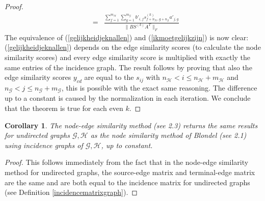 \documentclass[a4paper,11pt]{report}
\newtheorem{corollary}[theorem]{Corollary}
\newcommand{\graf}{\mathscr{G}}
\newcommand{\grafeen}{\mathscr{H}}
\newcommand{\hgraf}{\mathcal{G}}
\newcommand{\hgrafeen}{\mathcal{H}}
\begin{document}
\begin{proof}
\begin{eqnarray}
 &=& \frac{\sum^{m_\hgrafeen}_{f=1}\sum^{m_\hgraf}_{g=1} 
b'_{i,f}s^{(k)}_{f+n_\hgrafeen,g+n_\hgraf}a'_{j,g}}{\|BS^{(k)}A^T\|_F}\label{gelijkheidjeknallen}
\end{eqnarray}
The equivalence of (\ref{gelijkheidjeknallen}) and (\ref{ikmoetgelijkzijn}) is 
now clear: (\ref{gelijkheidjeknallen}) depends on the edge similarity scores (to 
calculate the node similarity scores) and every edge similarity score is 
multiplied with exactly the same entries of the incidence graph. The result 
follows by proving that also the edge similarity scores $y_{cd}$ are equal to 
the $s_{ij}$ with $n_\hgrafeen < i \leq n_\hgrafeen + m_\hgrafeen$ and $n_\hgraf < j \leq n_\hgraf + 
m_\hgraf$, this is possible with the exact same reasoning. The difference up to 
a constant is caused by the normalization in each iteration. We conclude that 
the theorem is true for each even $k$.
 \end{proof}

 \begin{corollary}\label{gelijktjekdj}
   The node-edge similarity method (see 2.3) returns the same results for undirected graphs $\graf, \grafeen$ as
   the node similarity method of Blondel (see 2.1) using incidence graphs of $\graf, \grafeen$, up to constant. 
 \end{corollary}

\begin{proof}
  This follows immediately from the fact that in the node-edge similarity method 
  for undirected graphs, the source-edge matrix and terminal-edge matrix are the 
  same and are both equal to the incidence matrix for undirected graphs (see Definition \ref{incidencematrixgraph}).
\end{proof}
 
\end{document}
